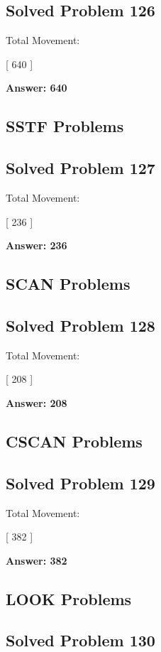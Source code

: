 \subsection{Solved Problem 126}

Total Movement:

[
640
]

\textbf{Answer: 640}

\subsection{SSTF Problems}

\subsection{Solved Problem 127}

Total Movement:

[
236
]

\textbf{Answer: 236}

\subsection{SCAN Problems}

\subsection{Solved Problem 128}

Total Movement:

[
208
]

\textbf{Answer: 208}

\subsection{CSCAN Problems}

\subsection{Solved Problem 129}

Total Movement:

[
382
]

\textbf{Answer: 382}

\subsection{LOOK Problems}

\subsection{Solved Problem 130}

